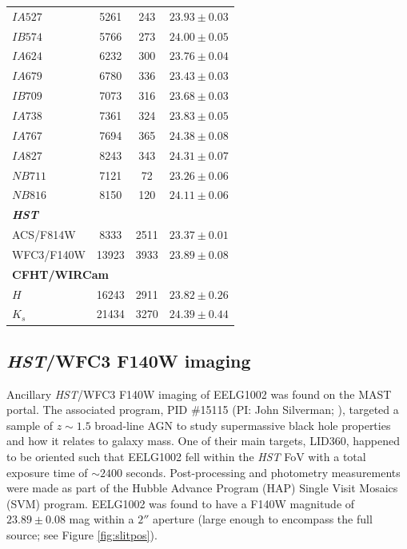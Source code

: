 \documentclass[twocolumn,tight,times,linenumbers]{aastex631}
\begin{document}
\begin{table}
\begin{tabular*}{\columnwidth}{@{\extracolsep{\fill}}lccc}
				$IA527$ & 5261 & 243 & $23.93\pm0.03$\\
				$IB574$ & 5766 & 273 & $24.00\pm0.05$\\
				$IA624$ & 6232 & 300 & $23.76\pm0.04$\\
				$IA679$ & 6780 & 336 & $23.43\pm0.03$\\
				$IB709$ & 7073 & 316  & $23.68\pm0.03$\\
				$IA738$ & 7361 & 324 & $23.83\pm0.05$\\
				$IA767$ & 7694 & 365 & $24.38\pm0.08$\\
				$IA827$ & 8243 & 343 & $24.31\pm0.07$\\
				$NB711$ & 7121 & 72 & $23.26\pm0.06$\\
				$NB816$ & 8150 & 120 & $24.11\pm0.06$ \\
				\multicolumn{4}{l}{\textbf{\textit{HST}}} \\
				ACS/F814W & 8333 & 2511 & $23.37\pm0.01$\\
				WFC3/F140W & 13923 & 3933 & $23.89\pm0.08$\\
				\multicolumn{4}{l}{\textbf{CFHT/WIRCam}} \\
				$H$ & 16243 & 2911 & $23.82\pm0.26$\\	
				$K_s$ & 21434 & 3270 & $24.39\pm0.44$ \\																																					
				\hline
			\end{tabular*}
		\end{table}
		
		\subsection{\textit{HST}/WFC3 F140W imaging}
		\label{sec:WFC3}
		
		Ancillary \textit{HST}/WFC3 F140W imaging of EELG1002 was found on the MAST portal. The associated program, PID \#15115 (PI: John Silverman; \citealt{Silverman2018,Ding2020}), targeted a sample of $z \sim 1.5$ broad-line AGN to study supermassive black hole properties and how it relates to galaxy mass. One of their main targets, LID360, happened to be oriented such that EELG1002 fell within the \textit{HST} FoV with a total exposure time of $\sim 2400$ seconds. Post-processing and photometry measurements were made as part of the Hubble Advance Program (HAP) Single Visit Mosaics (SVM) program. EELG1002 was found to have a F140W magnitude of $23.89\pm0.08$ mag within a $2''$ aperture (large enough to encompass the full source; see Figure \ref{fig:slitpos}).
\end{document}
